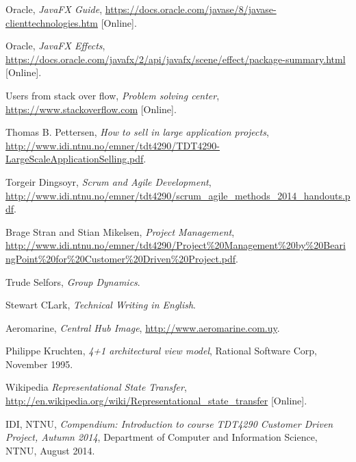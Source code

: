 \documentclass[../document]{subfiles}
\begin{document}
\begin{thebibliography}{1}
\label{Bibliography}

Oracle,
{\em JavaFX Guide},
\url{https://docs.oracle.com/javase/8/javase-clienttechnologies.htm} [Online].

Oracle,
{\em JavaFX Effects},
\url{https://docs.oracle.com/javafx/2/api/javafx/scene/effect/package-summary.html} [Online].

Users from stack over flow, 
{\em Problem solving center},
\url{https://www.stackoverflow.com} [Online].

Thomas B. Pettersen, 
{\em How to sell in large application projects},
\url{http://www.idi.ntnu.no/emner/tdt4290/TDT4290-LargeScaleApplicationSelling.pdf}.

Torgeir Dingsoyr, 
{\em Scrum and Agile Development},
\url{http://www.idi.ntnu.no/emner/tdt4290/scrum_agile_methods_2014_handouts.pdf}.

Brage Stran and Stian Mikelsen, 
{\em Project Management},
\url{http://www.idi.ntnu.no/emner/tdt4290/Project%20Management%20by%20BearingPoint%20for%20Customer%20Driven%20Project.pdf}.

Trude Selfors, 
{\em Group Dynamics}.

Stewart CLark, 
{\em Technical Writing in English}.

Aeromarine,
{\em Central Hub Image},
\url{http://www.aeromarine.com.uy}.


 Philippe Kruchten, {\em 4+1 architectural view model}, Rational Software Corp, November 1995.

Wikipedia {\em Representational State Transfer}, \url{http://en.wikipedia.org/wiki/Representational_state_transfer} [Online].

 IDI, NTNU, {\em Compendium: Introduction to course TDT4290 Customer Driven Project, Autumn 2014}, Department of Computer and Information Science, NTNU,  August 2014.


\end{thebibliography}
\end{document}
